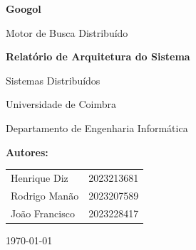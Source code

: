 \documentclass[12pt,a4paper]{article}
\begin{document}
\begin{titlepage}
    \centering
    \vspace*{2cm}
    
    {\Huge\bfseries Googol\par}
    \vspace{0.5cm}
    {\LARGE Motor de Busca Distribuído\par}
    \vspace{1cm}
    {\Large\bfseries Relatório de Arquitetura do Sistema\par}
    
    \vspace{2cm}
    
    {\Large Sistemas Distribuídos\par}
    \vspace{0.5cm}
    {\large Universidade de Coimbra\par}
    {\large Departamento de Engenharia Informática\par}
    
    \vfill
    
    {\large\bfseries Autores:\par}
    \vspace{0.5cm}
    \begin{tabular}{ll}
        Henrique Diz & 2023213681 \\
        Rodrigo Manão & 2023207589 \\
        João Francisco & 2023228417 \\
    \end{tabular}
    
    \vspace{1cm}
    
    {\large \today\par}
\end{titlepage}

\tableofcontents
\newpage

\begin{abstract}
Este relatório descreve a arquitetura completa do Googol, um motor de busca distribuído desenvolvido como projeto da disciplina de Sistemas Distribuídos. O sistema utiliza tecnologias como Java RMI para comunicação entre componentes distribuídos, Spring Boot para a camada de API REST, e React/Next.js para o frontend. A arquitetura implementa conceitos avançados como balanceamento de carga, tolerância a falhas, replicação de dados, deteção dinâmica de stopwords, e análise contextual com inteligência artificial.
\end{abstract}
\end{document}

